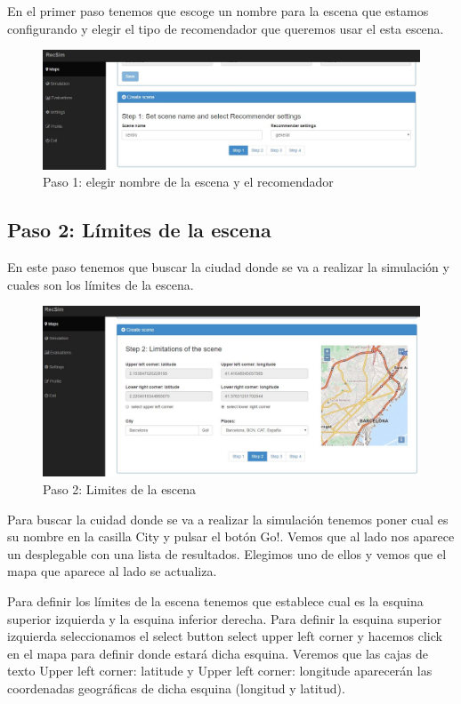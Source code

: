 En el primer paso tenemos que escoge un nombre para la escena que estamos configurando y elegir el tipo de recomendador que queremos usar el esta escena.

\begin{figure}[H]
	\centering\includegraphics[scale=0.35]{imagenes/capitulo9/crear-escena-1.JPG}
	\caption{Paso 1: elegir nombre de la escena y el recomendador}
	\label{img:paso1}
\end{figure}

\subsection{Paso 2: Límites de la escena}

En este paso tenemos que buscar la ciudad donde se va a realizar la simulación y cuales son los límites de la escena.

\begin{figure}[H]
	\centering\includegraphics[scale=0.35]{imagenes/capitulo9/crear-escena-2.JPG}
	\caption{Paso 2: Limites de la escena}
	\label{img:paso2}
\end{figure}

Para buscar la cuidad donde se va a realizar la simulación tenemos poner cual es su nombre en la casilla City y pulsar el botón Go!. Vemos que al lado nos aparece un desplegable con una lista de resultados. Elegimos uno de ellos y vemos que el mapa que aparece al lado se actualiza.

Para definir los límites de la escena tenemos que establece cual es la esquina superior izquierda y la esquina inferior derecha. Para definir la esquina superior izquierda seleccionamos el select button select upper left corner y hacemos click en el mapa para definir donde estará dicha esquina. Veremos que las cajas de texto Upper left corner: latitude y Upper left corner: longitude aparecerán las coordenadas geográficas de dicha esquina (longitud y latitud).

